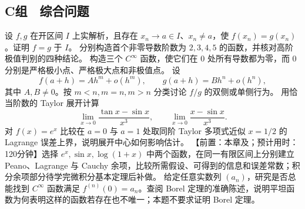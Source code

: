 \subsection*{C组　综合问题}
\begin{enumerate}[label=\textbf{\thechapter.\arabic*.},resume]
  设 \(f,g\) 在开区间 \(I\) 上实解析，且存在 \(x_n\to a\in I\)、\(x_n\ne a\)，使 \(f(x_n)=g(x_n)\)。证明 \(f=g\) 于 \(I\)。
  分别构造首个非零导数阶数为 \(2,3,4,5\) 的函数，并核对高阶极值判别的四种结论。
  构造三个 \(C^\infty\) 函数，使它们在 \(0\) 处所有导数都为零，而 \(0\) 分别是严格极小点、严格极大点和非极值点。
  设
 \[
  f(a+h)=Ah^m+o(h^m),\qquad g(a+h)=Bh^n+o(h^n),
 \]
 其中 \(A,B\ne0\)。按 \(m<n,m=n,m>n\) 分类讨论 \(f/g\) 的双侧或单侧行为。
  用恰当阶数的 Taylor 展开计算
 \[
  \lim_{x\to0}\frac{\tan x-\sin x}{x^3},\qquad
  \lim_{x\to0}\frac{x-\sin x}{x^3}.
 \]
  对 \(f(x)=e^x\) 比较在 \(a=0\) 与 \(a=1\) 处取同阶 Taylor 多项式近似 \(x=1/2\) 的 Lagrange 误差上界，说明展开中心如何影响估计。
  【前置：本章及；预计用时：120分钟】选择 \(e^x,\sin x,\log(1+x)\) 中两个函数，在同一有限区间上分别建立 Peano、Lagrange 与 Cauchy 余项，比较所需假设、可得到的信息和误差常数；积分余项部分待学完微积分基本定理后补做。
  给定任意实数列 \((a_n)\)，研究是否总能找到 \(C^\infty\) 函数满足 \(f^{(n)}(0)=a_n\)。查阅 Borel 定理的准确陈述，说明平坦函数为何表明这样的函数若存在也不唯一；本题不要求证明 Borel 定理。
\end{enumerate}
